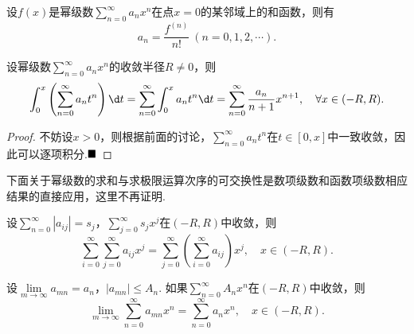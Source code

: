 \begin{corollary}[幂级数系数与各阶导数的关系]\label{relation}
	设$f(x)$是幂级数$\displaystyle\sum_{n=0}^{\infty}a_nx^n$在点$x=0$的某邻域上的和函数，则有
	$$a_n=\frac{f^{(n)}}{n!}\ (n=0,1,2,\cdots).$$
\end{corollary}
\begin{theorem}[逐项积分]
	设幂级数$\displaystyle\sum_{n=0}^{\infty}a_nx^n$的收敛半径$R\neq 0$，则
	$$\int_{0}^{x}\left(\sum_{n=0}^{\infty}a_nt^n\right)\d t=\sum_{n=0}^{\infty}\int_{0}^{x}a_nt^n\d t=\sum_{n=0}^{\infty}\frac{a_n}{n+1}x^{n+1},\quad \forall x\in(-R,R).$$
\end{theorem}
\begin{proof}
	不妨设$x>0$，则根据前面的讨论，$\displaystyle\sum_{n=0}^{\infty}a_nt^n$在$t\in\left[0,x\right]$中一致收敛，因此可以逐项积分.$\hfill\blacksquare$
\end{proof}
下面关于幂级数的求和与求极限运算次序的可交换性是数项级数和函数项级数相应结果的直接应用，这里不再证明.
\begin{theorem}[求和可交换性]
	设$\displaystyle\sum_{n=0}^{\infty}|a_{ij}|=s_j$，$\displaystyle\sum_{j=0}^{\infty}s_jx^j$在$(-R,R)$中收敛，则
	$$\sum_{i=0}^{\infty}\sum_{j=0}^{\infty}a_{ij}x^j=\sum_{j=0}^{\infty}\left(\sum_{i=0}^{\infty}a_{ij}\right)x^j,\quad x\in(-R,R).$$
\end{theorem}
\begin{theorem}[求极限可交换性]
	设$\lim\limits_{m\to\infty}a_{mn}=a_n$，$|a_{mn}|\leqslant A_n$. 如果$\displaystyle\sum_{n=0}^{\infty}A_nx^n$在$(-R,R)$中收敛，则
	$$\lim\limits_{m\to\infty}\sum_{n=0}^{\infty}a_{mn}x^n=\sum_{n=0}^{\infty}a_nx^n,\quad x\in(-R,R).$$
\end{theorem}
